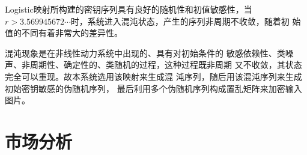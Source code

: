 Logistic映射所构建的密钥序列具有良好的随机性和初值敏感性，当$r >
3.569945672\dotsb$时，系统进入混沌状态，产生的序列非周期不收敛，随着初
始值的不同有着非常大的差异性\cite{yang2011}。

混沌现象是在非线性动力系统中出现的、具有对初始条件的
敏感依赖性、类噪声、非周期性、确定性的、类随机的过程，这种过程既非周期
又不收敛，其状态完全可以重现\cite{lu2007}。故本系统选用该映射来生成混
沌序列，随后用该混沌序列来生成初始密钥敏感的伪随机序列，
最后利用多个伪随机序列构成置乱矩阵来加密输入图片。

\section{市场分析}
\label{sec:market-analysis}


